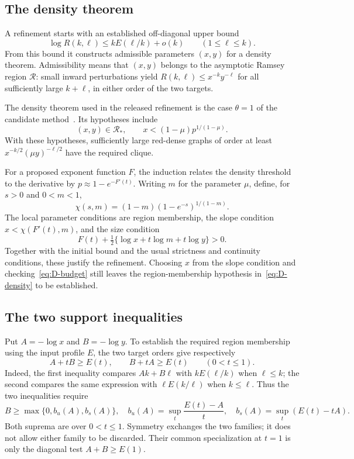 \documentclass[11pt]{article}
\theoremstyle{definition}
\theoremstyle{remark}
\newcommand{\RR}{\mathcal R}
\numberwithin{equation}{section}
\begin{document}
\subsection{The density theorem}

A refinement starts with an established off-diagonal upper bound
\[
 \log R(k,\ell)\le kE(\ell/k)+o(k)\qquad(1\le\ell\le k).
\]
From this bound it constructs admissible parameters $(x,y)$ for a density theorem. Admissibility means that $(x,y)$ belongs to the asymptotic Ramsey region $\RR$: small inward perturbations yield $R(k,\ell)\le x^{-k}y^{-\ell}$ for all sufficiently large $k+\ell$, in either order of the two targets.

The density theorem used in the released refinement is the case $\theta=1$ of the candidate method~\cite[Theorem 13]{GNNW}. Its hypotheses include
\begin{equation}\label{eq:D-density}
 (x,y)\in\RR_*,\qquad
 x<(1-\mu)p^{1/(1-\mu)}.
\end{equation}
With these hypotheses, sufficiently large red-dense graphs of order at least $x^{-k/2}(\mu y)^{-\ell/2}$ have the required clique.

For a proposed exponent function $F$, the induction relates the
density threshold to the derivative by $p\approx1-e^{-F'(t)}$.
Writing $m$ for the parameter $\mu$, define, for $s>0$ and $0<m<1$,
\[
 \chi(s,m)=(1-m)(1-e^{-s})^{1/(1-m)}.
\]
The local parameter conditions are region membership, the slope condition $x<\chi(F'(t),m)$, and the size condition
\begin{equation}\label{eq:D-budget}
 F(t)+\tfrac12\{\log x+t\log m+t\log y\}>0.
\end{equation}
Together with the initial bound and the usual strictness and continuity conditions, these justify the refinement. Choosing $x$ from the slope condition and checking~\eqref{eq:D-budget} still leaves the region-membership hypothesis in~\eqref{eq:D-density} to be established.

\subsection{The two support inequalities}

Put $A=-\log x$ and $B=-\log y$. To establish the required region membership using the input profile $E$, the two target orders give respectively
\begin{equation}\label{eq:D-support}
 A+tB\ge E(t),\qquad B+tA\ge E(t)\qquad(0<t\le1).
\end{equation}
Indeed, the first inequality compares $Ak+B\ell$ with $kE(\ell/k)$ when $\ell\le k$; the second compares the same expression with $\ell E(k/\ell)$ when $k\le\ell$. Thus the two inequalities require
\[
 B\ge\max\{0,b_u(A),b_s(A)\},\quad
 b_u(A)=\sup_t\frac{E(t)-A}{t},\quad
 b_s(A)=\sup_t(E(t)-tA).
\]
Both suprema are over $0<t\le1$. Symmetry exchanges the two families;
it does not allow either family to be discarded. Their common
specialization at $t=1$ is only the diagonal test $A+B\ge E(1)$.
\end{document}
